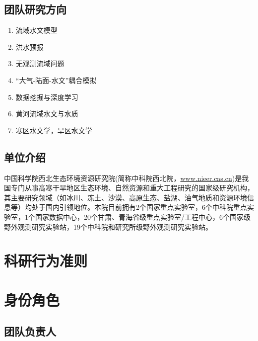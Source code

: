 \documentclass[
]{book}
\providecommand{\tightlist}{%
  \setlength{\itemsep}{0pt}\setlength{\parskip}{0pt}}
\begin{document}
\hypertarget{sec:resinst}{%
\subsection{团队研究方向}\label{sec:resinst}}

\begin{enumerate}
\def\labelenumi{\arabic{enumi}.}
\tightlist
\item
  流域水文模型
\item
  洪水预报
\item
  无观测流域问题
\item
  ``大气-陆面-水文''耦合模拟
\item
  数据挖掘与深度学习
\item
  黄河流域水文与水质
\item
  寒区水文学，旱区水文学
\end{enumerate}

\hypertarget{ux5355ux4f4dux4ecbux7ecd}{%
\subsection{单位介绍}\label{ux5355ux4f4dux4ecbux7ecd}}

中国科学院西北生态环境资源研究院(简称中科院西北院，\href{http://www.nieer.cas.cn}{www.nieer.cas.cn})是我国专门从事高寒干旱地区生态环境、自然资源和重大工程研究的国家级研究机构，其主要研究领域（如冰川、冻土、沙漠、高原生态、盐湖、油气地质和资源环境信息等）均处于国内引领地位。本院目前拥有2个国家重点实验室，6个中科院重点实验室，1个国家数据中心，20个甘肃、青海省级重点实验室/工程中心，6个国家级野外观测研究实验站，19个中科院和研究所级野外观测研究实验站。

\hypertarget{ux79d1ux7814ux884cux4e3aux51c6ux5219}{%
\section{科研行为准则}\label{ux79d1ux7814ux884cux4e3aux51c6ux5219}}

\hypertarget{ux8eabux4efdux89d2ux8272}{%
\section{身份角色}\label{ux8eabux4efdux89d2ux8272}}

\hypertarget{ux56e2ux961fux8d1fux8d23ux4eba}{%
\subsection{团队负责人}\label{ux56e2ux961fux8d1fux8d23ux4eba}}
\end{document}
